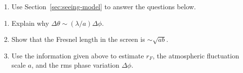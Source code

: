 \begin{enumerate}[series=info, leftmargin=\parindent,
		listparindent=\parindent]
	\item[] Use Section~\ref{sec:seeing-model} to answer the questions below.
\end{enumerate}
\begin{enumerate}[resume* = questions]
\item Explain why $\Delta\theta\sim({\lambda/a})\Delta\phi$.
\item Show that the Fresnel length in the screen is $\sim\sqrt{ab}$. 
\item Use the information given above to estimate $r_F$, the atmospheric fluctuation
scale $a$, and the rms phase variation $\Delta\phi$.
\end{enumerate}
